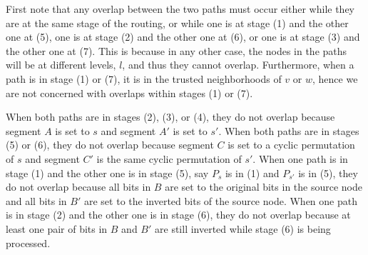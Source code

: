 \documentclass{sig-alternate-05-2015}
\begin{document}
First note that any overlap between the two paths must occur either while they
are at the same stage of the routing, or while one is at stage (1) and the other one at (5), one is at stage (2) and the other one at (6), or one is at stage (3) and the other one at (7).
This is because in any other case,
the nodes in the paths will be at different levels, $l$,
and thus they cannot overlap.
Furthermore, when a path is in stage (1) or (7),
it is in the trusted neighborhoods of $v$ or $w$,
hence we are not concerned with overlaps within stages (1) or (7). 

When both paths are in stages (2), (3), or (4), they do not overlap because
segment $A$ is set to $s$ and segment $A'$ is set to $s'$.
When both paths are in stages (5) or (6),
they do not overlap because segment $C$ is set to a cyclic permutation of $s$
and segment $C'$ is the same cyclic permutation of $s'$.
When one path is in stage (1) and the other one is in stage (5),
say $P_s$ is in (1) and $P_{s'}$ is in (5),
they do not overlap because all bits in $B$ are set to the original bits in the
source node and all bits in $B'$ are set to the inverted bits of the source node.
When one path is in stage (2) and the other one is in stage (6), they do not
overlap because at least one pair of bits in $B$ and $B'$ are still inverted
while stage (6) is being processed. 
\end{document}

